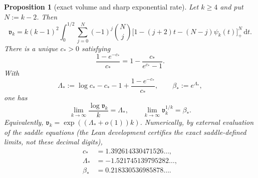 \documentclass[11pt]{article}
\newtheorem{proposition}[theorem]{Proposition}
\theoremstyle{definition}
\theoremstyle{remark}
\begin{document}
\begin{proposition}[exact volume and sharp exponential rate]
\label{prop:B-volume-exact}
Let $k\ge4$ and put $N:=k-2$.  Then
\begin{equation}\label{eq:B-volume-exact}
 \mathfrak v_k
 =k(k-1)^2\int_0^{1/2}\sum_{j=0}^{N}(-1)^j\binom Nj
 \bigl[1-(j+2)t-(N-j)\psi_k(t)\bigr]_+^N\,\mathrm d t.
\end{equation}
There is a unique $c_*>0$ satisfying
\begin{equation}\label{eq:B-volume-saddle}
 \frac{1-e^{-c_*}}{c_*}
 =1-\frac{c_*}{e^{c_*}-1}.
\end{equation}
With
\begin{equation}\label{eq:B-volume-rate}
 \Lambda_*:=\log c_*-c_*-1+\frac{1-e^{-c_*}}{c_*},
 \qquad \beta_*:=e^{\Lambda_*},
\end{equation}
one has
\begin{equation}\label{eq:B-volume-asymptotic}
 \lim_{k\to\infty}\frac{\log\mathfrak v_k}{k}=\Lambda_*,
 \qquad
 \lim_{k\to\infty}\mathfrak v_k^{1/k}=\beta_*.
\end{equation}
Equivalently, $\mathfrak v_k=\exp((\Lambda_*+o(1))k)$.  Numerically, by
external evaluation of the saddle equations (the Lean development
certifies the exact saddle-defined limits, not these decimal digits),
\[
 \begin{aligned}
 c_*&=1.392614330471526\ldots,\\
 \Lambda_*&=-1.521745139795282\ldots,\\
 \beta_*&=0.218330536985878\ldots.
 \end{aligned}
\]
\end{proposition}
\end{document}
